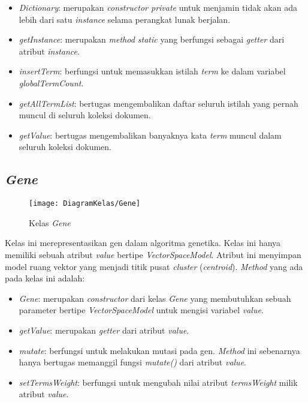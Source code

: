 \begin{itemize}
	\item \textit{Dictionary}: merupakan \textit{constructor private} untuk menjamin tidak akan ada lebih dari satu \textit{instance} selama perangkat lunak berjalan.
	\item \textit{getInstance}: merupakan \textit{method static} yang berfungsi sebagai \textit{getter} dari atribut \textit{instance}.
	\item \textit{insertTerm}: berfungsi untuk memasukkan istilah \textit{term} ke dalam variabel \textit{globalTermCount}.
	\item \textit{getAllTermList}: bertugas mengembalikan daftar seluruh istilah yang pernah muncul di seluruh koleksi dokumen.
	\item \textit{getValue}: bertugas mengembalikan banyaknya kata \textit{term} muncul dalam seluruh koleksi dokumen. 
\end{itemize}

\subsection{\textit{Gene}}

\begin{figure}[h]
	\begin{center}
		\texttt{[image: DiagramKelas/Gene]}
		\caption{Kelas \textit{Gene}}
		\label{fig:kelasGene}
	\end{center}
\end{figure}

Kelas ini merepresentasikan gen dalam algoritma genetika. Kelas ini hanya memiliki sebuah atribut \textit{value} bertipe \textit{VectorSpaceModel}. Atribut ini menyimpan model ruang vektor yang menjadi titik pusat \textit{cluster} (\textit{centroid}). \textit{Method} yang ada pada kelas ini adalah:

\begin{itemize}
	\item \textit{Gene}: merupakan \textit{constructor} dari kelas \textit{Gene} yang membutuhkan sebuah parameter bertipe \textit{VectorSpaceModel} untuk mengisi variabel \textit{value}.
	\item \textit{getValue}: merupakan \textit{getter} dari atribut \textit{value}.
	\item \textit{mutate}: berfungsi untuk melakukan mutasi pada gen. \textit{Method} ini sebenarnya hanya bertugas memanggil fungsi \textit{mutate()} dari atribut \textit{value}.
	\item \textit{setTermsWeight}: berfungsi untuk mengubah nilai atribut \textit{termsWeight} milik atribut \textit{value}.
\end{itemize}

